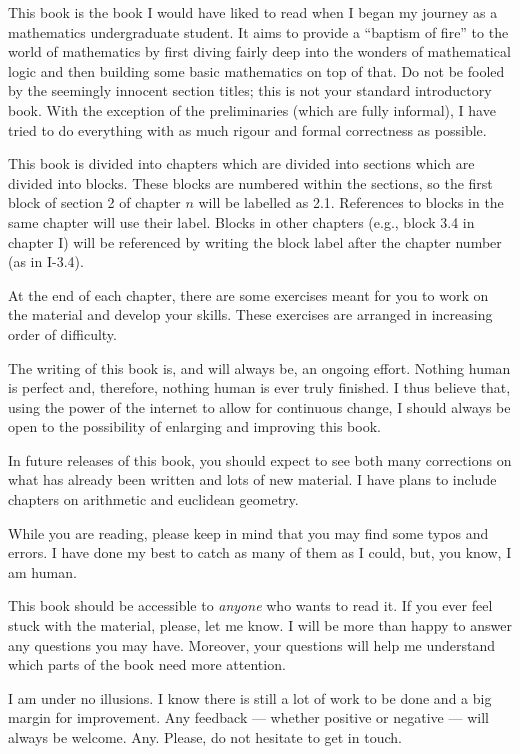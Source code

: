 
\begin{para*}
This book is the book I would have liked to read when I began my journey as a mathematics undergraduate student.
It aims to provide a ``baptism of fire'' to the world of mathematics by first diving fairly deep into the wonders of mathematical logic and then building some basic mathematics on top of that. Do not be fooled by the seemingly innocent section titles; this is not your standard introductory book.
With the exception of the preliminaries (which are fully informal), I have tried to do everything with as much rigour and formal correctness as possible. 
\end{para*}


\begin{para*}
This book is divided into chapters which are divided into sections which are divided into blocks. These blocks are numbered within the sections, so the first block of section 2 of chapter $n$ will be labelled as 2.1.
References to blocks in the same chapter will use their label. Blocks in other chapters (e.g., block 3.4 in chapter I) will be referenced by writing the block label after the chapter number (as in I-3.4).

At the end of each chapter, there are some exercises meant for you to work on the material and develop your skills. These exercises are arranged in increasing order of difficulty.
\end{para*}

\begin{para*}
The writing of this book is, and will always be, an ongoing effort.
Nothing human is perfect and, therefore, nothing human is ever truly finished. I thus believe that, using the power of the internet to allow for continuous change, I should always be open to the possibility of enlarging and improving this book.

In future releases of this book, you should expect to see both many corrections on what has already been written and lots of new material. I have plans to include chapters on arithmetic and euclidean geometry. 

While you are reading, please keep in mind that you may find some typos and errors. I have done my best to catch as many of them as I could, but, you know, I am human.
\end{para*}

\begin{para*}
This book should be accessible to \emph{anyone} who wants to read it. If you ever feel stuck with the material, please, let me know. I will be more than happy to answer any questions you may have. Moreover, your questions will help me understand which parts of the book need more attention.

I am under no illusions. I know there is still a lot of work to be done and a big margin for improvement. Any feedback --- whether positive or negative --- will always be welcome. Any. Please, do not hesitate to get in touch.  
\end{para*}

